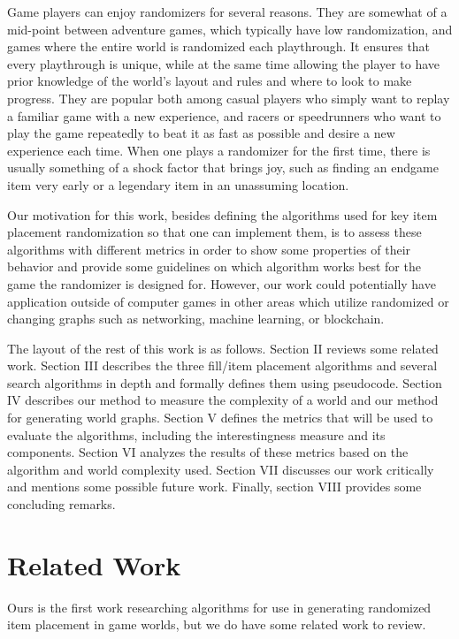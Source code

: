 \documentclass{ieeeaccess}
\begin{document}
Game players can enjoy randomizers for several reasons. They are somewhat of a mid-point between
adventure games, which typically have low randomization, and games where the entire world is
randomized each playthrough. It ensures that every playthrough is unique, while at the same time
allowing the player to have prior knowledge of the world's layout and rules and where to look to
make progress. They are popular both among casual players who simply want to replay a familiar
game with a new experience, and racers or speedrunners who want to play the game repeatedly to
beat it as fast as possible and desire a new experience each time. When one plays a randomizer
for the first time, there is usually something of a shock factor that brings joy, such as
finding an endgame item very early or a legendary item in an unassuming location.

Our motivation for this work, besides defining the algorithms used for key item placement
randomization so that one can implement them, is to assess these algorithms with different
metrics in order to show some properties of their behavior and provide some guidelines on which
algorithm works best for the game the randomizer is designed for. However, our work could
potentially have application outside of computer games in other areas which utilize randomized
or changing graphs such as networking, machine learning, or blockchain.

The layout of the rest of this work is as follows. Section II reviews some related work. Section
III describes the three fill/item placement algorithms and several search algorithms in depth
and formally defines them using pseudocode. Section IV describes our method to measure the
complexity of a world and our method for generating world graphs. Section V defines the metrics
that will be used to evaluate the algorithms, including the interestingness measure and its
components. Section VI analyzes the results of these metrics based on the algorithm and world
complexity used. Section VII discusses our work critically and mentions some possible future
work. Finally, section VIII provides some concluding remarks.


\section{Related Work}
Ours is the first work researching algorithms for use in generating randomized item placement in
game worlds, but we do have some related work to review.
\end{document}

